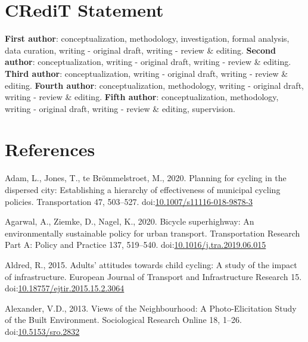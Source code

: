 \documentclass[]{elsarticle} %
\begin{document}
\hypertarget{sec:credit}{%
\section{CRediT Statement}\label{sec:credit}}

\textbf{First author}: conceptualization, methodology, investigation,
formal analysis, data curation, writing - original draft, writing -
review \& editing. \textbf{Second author}: conceptualization, writing -
original draft, writing - review \& editing. \textbf{Third author}:
conceptualization, writing - original draft, writing - review \&
editing. \textbf{Fourth author}: conceptualization, methodology, writing
- original draft, writing - review \& editing. \textbf{Fifth author}:
conceptualization, methodology, writing - original draft, writing -
review \& editing, supervision.

\hypertarget{sec:references}{%
\section*{References}\label{sec:references}}

\hypertarget{refs}{}
\leavevmode\hypertarget{ref-adamPlanningCyclingDispersed2020}{}%
Adam, L., Jones, T., te Brömmelstroet, M., 2020. Planning for cycling in
the dispersed city: Establishing a hierarchy of effectiveness of
municipal cycling policies. Transportation 47, 503--527.
doi:\href{https://doi.org/10.1007/s11116-018-9878-3}{10.1007/s11116-018-9878-3}

\leavevmode\hypertarget{ref-agarwalBicycleSuperhighwayEnvironmentally2020}{}%
Agarwal, A., Ziemke, D., Nagel, K., 2020. Bicycle superhighway: An
environmentally sustainable policy for urban transport. Transportation
Research Part A: Policy and Practice 137, 519--540.
doi:\href{https://doi.org/10.1016/j.tra.2019.06.015}{10.1016/j.tra.2019.06.015}

\leavevmode\hypertarget{ref-aldredAdultsAttitudesChild2015}{}%
Aldred, R., 2015. Adults' attitudes towards child cycling: A study of
the impact of infrastructure. European Journal of Transport and
Infrastructure Research 15.
doi:\href{https://doi.org/10.18757/ejtir.2015.15.2.3064}{10.18757/ejtir.2015.15.2.3064}

\leavevmode\hypertarget{ref-alexanderViewsNeighbourhoodPhotoElicitation2013}{}%
Alexander, V.D., 2013. Views of the Neighbourhood: A Photo-Elicitation
Study of the Built Environment. Sociological Research Online 18, 1--26.
doi:\href{https://doi.org/10.5153/sro.2832}{10.5153/sro.2832}
\end{document}
